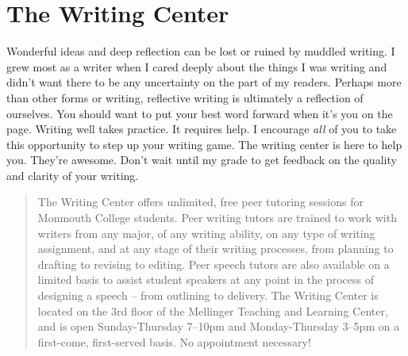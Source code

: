 \documentclass[nobib]{tufte-handout}
\begin{document}
\section{The Writing Center}

Wonderful ideas and deep reflection can be lost or ruined by muddled writing.  I grew most as a writer when I cared deeply about the things I was writing and didn't want there to be any uncertainty on the part of my readers. Perhaps more than other forms or writing, reflective writing is ultimately a reflection of ourselves. You should want to put your best word forward when it's you on the page. Writing well takes practice. It requires help. I encourage \textit{all} of you to take this opportunity to step up your writing game. The writing center is here to help you. They're awesome. Don't wait until my grade to get feedback on the quality and clarity of your writing.
\begin{quote}
  The Writing Center offers unlimited, free peer tutoring sessions for Monmouth College students.  Peer writing tutors are trained to work with writers from any major, of any writing ability, on any type of writing assignment, and at any stage of their writing processes, from planning to drafting to revising to editing.  Peer speech tutors are also available on a limited basis to assist student speakers at any point in the process of designing a speech – from outlining to delivery.  The Writing Center is  located on the 3rd floor of the Mellinger Teaching and Learning Center, and is open Sunday-Thursday 7--10pm and Monday-Thursday 3--5pm on a first-come, first-served basis.  No appointment necessary!
\end{quote}
\end{document}
